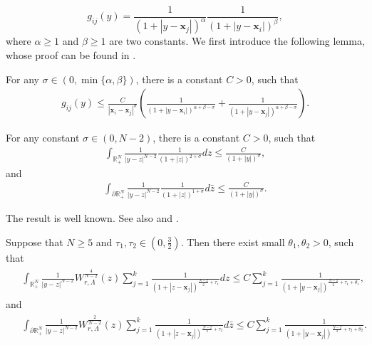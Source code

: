 \documentclass[11pt,a4paper]{amsart}
\begin{document}
\begin{equation}
g_{i j}(y)=\frac{1}{\left(1+\left|y-\mathbf{x}_{j}\right|\right)^{\alpha}} \frac{1}{\left(1+\left|y-\mathbf{x}_{i}\right|\right)^{\beta}} ,
\end{equation}
where $\alpha \geq 1$ and $\beta \geq 1$ are two constants.
We first introduce the following lemma, whose proof can be found in \cite[Appendix B]{WeiYan_2010a}.

\begin{lemma}\label{lemma.appendix_estimates_1}
  For any $\sigma\in(0,\min\{\alpha,\beta\})$, there is a constant $C>0$, such that
\begin{align}
  g_{i j}(y) \leq \frac{C}{\left|\mathbf{x}_{i}-\mathbf{x}_{j}\right|^{\sigma}}\left(\frac{1}{\left(1+\left|y-\mathbf{x}_{i}\right|\right)^{\alpha+\beta-\sigma}}+\frac{1}{{\left(1+\left|y-\mathbf{x}_{j}\right|\right)}^{\alpha+\beta-\sigma}}\right).
\end{align}
\end{lemma}

\begin{lemma}\label{lemma.appendix_estimates_2}

For any constant $\sigma\in(0,N-2)$, there is a constant $C>0$, such that
\begin{align}
  \int_{\mathbb{R}_{+}^{N}} \frac{1}{|y-z|^{N-2}} \frac{1}{(1+|z|)^{2+\sigma}} d z \leq \frac{C}{{(1+|y|)}^{\sigma}},
\end{align}
and
\begin{align}
  \int_{\partial \mathbb{R}_{+}^{N}} \frac{1}{|y-z|^{N-2}} \frac{1}{(1+|z|)^{1+\sigma}} d \bar{z} \leq \frac{C}{{(1+|y|)}^{\sigma}}.
\end{align}
\end{lemma}
The result is well known. See also \cite[Lemma B.2]{WeiYan_2010a} and \cite[Lemma A.4]{WangZhao_2013}.

\begin{lemma}\label{lemma.appendix_estimates_3}
  Suppose that $N\geq 5$ and $\tau_1,\tau_2 \in \left(0,\frac{3}{2}\right)$. Then there exist small $\theta_1,\theta_2>0$, such that
  \begin{align*}
    \begin{aligned}
      & \int_{\mathbb{R}_{+}^{N}} \frac{1}{|y-z|^{N-2}} W_{r, \Lambda}^{\frac{4}{N-2}}(z) \sum_{j=1}^{k} \frac{1}{\left(1+\left|z-\mathbf{x}_{j}\right|\right)^{\frac{N-2}{2}+\tau_1}} d z \leq C \sum_{j=1}^{k} \frac{1}{\left(1+\left|y-\mathbf{x}_{j}\right|\right)^{\frac{N-2}{2}+\tau_1+\theta_1}},
      \end{aligned}
  \end{align*}
  and   
  \begin{align*}
    \begin{aligned}
      & \int_{\partial\mathbb{R}_{+}^{N}} \frac{1}{|y-z|^{N-2}} W_{r, \Lambda}^{\frac{2}{N-2}}(z) \sum_{j=1}^{k} \frac{1}{\left(1+\left|z-\mathbf{x}_{j}\right|\right)^{\frac{N-2}{2}+\tau_2}} d \bar{z} \leq C \sum_{j=1}^{k} \frac{1}{\left(1+\left|y-\mathbf{x}_{j}\right|\right)^{\frac{N-2}{2}+\tau_2+\theta_2}}.
      \end{aligned}
  \end{align*}

\end{lemma}
\end{document}
